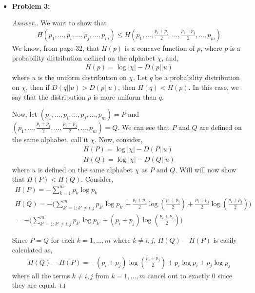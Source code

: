 \documentclass[10pt,twoside]{article}
\begin{document}
\begin{itemize}
\begin{proof}[Answer.]
    \end{proof}

    \newpage
    
    \item\textbf{Problem 3:} \newline
    \noindent\makebox[\linewidth]{\rule{18cm}{0.4pt}}
    
    \begin{proof}[Answer.]
    We want to show that 
    \begin{gather*}
        H(p_1,\ldots, p_i,\ldots, p_j,\ldots, p_m) \leq H(p_1,\ldots, \frac{p_i + p_j}{2}, \ldots, \frac{p_i+p_j}{2}, \ldots, p_m)
    \end{gather*}
    We know, from page 32, that $H(p)$ is a concave function of $p$, where $p$ is a probability distribution defined on the alphabet $\chi$, and,
    \begin{gather*}
        H(p) = \log|\chi| - D(p||u)
    \end{gather*}
    where $u$ is the uniform distribution on $\chi$. Let $q$ be a probability distribution on $\chi$, then if $D(q||u)>D(p||u)$, then $H(q) < H(p)$. In this case, we say that the distribution $p$ is more uniform than $q$.
    
    Now, let $(p_1,\ldots, p_i, \ldots, p_j, \ldots, p_m) = P$ and $(p_1,\ldots, \frac{p_i + p_j}{2}, \ldots,  \frac{p_i + p_j}{2}, \ldots, p_m ) = Q$. We can see that $P$ and $Q$ are defined on the same alphabet, call it $\chi$. Now, consider,
    \begin{gather*}
        H(P) = \log |\chi| - D(P||u) \\
        H(Q) = \log |\chi| - D(Q||u)
    \end{gather*}
    where $u$ is defined on the same alphabet $\chi$ as $P$ and $Q$. Will will now show that $H(P) < H(Q)$. Consider,
    \begin{gather*}
        H(P) = -\sum_{k=1}^m p_k\log p_k   \\
        H(Q) = -\Big( \sum_{k'=1; k'\neq i,j}^m p_{k'}\log p_{k'} + \frac{p_i + p_j}{2}\log ( \frac{p_i + p_j}{2} ) + \frac{p_i + p_j}{2} \log (\frac{p_i + p_j}{2} )  \Big) \\
        = -\Big( \sum_{k'=1; k'\neq i,j}^m p_{k'}\log p_{k'} + (p_i + p_j)\log (\frac{p_i + p_j}{2}) \Big)
    \end{gather*}

    Since $P=Q$ for each $k=1,\ldots, m$ where $k\neq i,j$, $H(Q)-H(P)$ is easily calculated as,
    \begin{gather*}
        H(Q) - H(P) = -(p_i + p_j)\log (\frac{p_i + p_j}{2}) + p_i\log p_i + p_j\log p_j
    \end{gather*}
    where all the terms $k\neq i,j$ from $k=1,\ldots, m$ cancel out to exactly $0$ since they are equal.


\end{proof}
\end{itemize}
\end{document}

